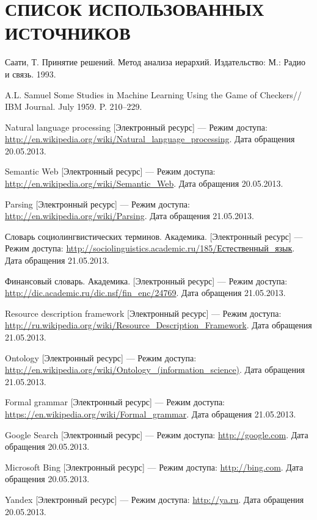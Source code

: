 \renewcommand*{\refname}{}
\section*{\centering СПИСОК ИСПОЛЬЗОВАННЫХ ИСТОЧНИКОВ}
\begin{thebibliography}{99}	
	Саати, Т. Принятие решений. Метод анализа иерархий. Издательство: М.: Радио и связь. 1993.	

	A.L. Samuel Some Studies in Machine Learning Using the Game of Checkers// IBM Journal. July 1959. P. 210–229.

	Natural language processing [Электронный ресурс] --- Режим доступа: \url{http://en.wikipedia.org/wiki/Natural_language_processing}. Дата обращения 20.05.2013.

	Semantic Web [Электронный ресурс] --- Режим доступа: \url{http://en.wikipedia.org/wiki/Semantic_Web}. Дата обращения 20.05.2013.

	Parsing [Электронный ресурс] --- Режим доступа: \url{http://en.wikipedia.org/wiki/Parsing}. Дата обращения 21.05.2013.

	Словарь социолингвистических терминов. Академика. [Электронный ресурс] --- Режим доступа: \url{http://sociolinguistics.academic.ru/185/Естественный_язык}. Дата обращения 21.05.2013.

	Финансовый словарь. Академика. [Электронный ресурс] --- Режим доступа: \url{http://dic.academic.ru/dic.nsf/fin_enc/24769}. Дата обращения 21.05.2013.

	Resource description framework [Электронный ресурс] --- Режим доступа: \url{http://ru.wikipedia.org/wiki/Resource_Description_Framework}. Дата обращения 21.05.2013.

	Ontology [Электронный ресурс] --- Режим доступа: \url{http://en.wikipedia.org/wiki/Ontology_(information_science)}. Дата обращения 21.05.2013. 

	Formal grammar [Электронный ресурс] --- Режим доступа: \url{https://en.wikipedia.org/wiki/Formal_grammar}. Дата обращения 21.05.2013.

	Google Search [Электронный ресурс] --- Режим доступа: \url{http://google.com}. Дата обращения 20.05.2013.

	Microsoft Bing [Электронный ресурс] --- Режим доступа: \url{http://bing.com}. Дата обращения 20.05.2013.

	Yandex [Электронный ресурс] --- Режим доступа: \url{http://ya.ru}. Дата обращения 20.05.2013.
\end{thebibliography}
